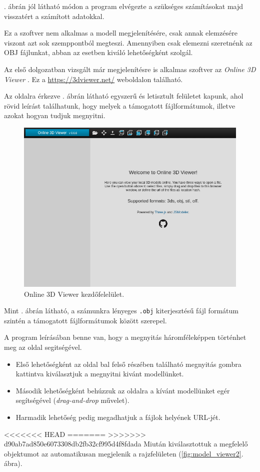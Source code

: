 . ábrán jól látható módon a program elvégezte a szükséges számításokat majd visszatért a számított adatokkal.

Ez a szoftver nem alkalmas a modell megjelenítésére, csak annak elemzésére viszont azt sok szemppontból megteszi. Amennyiben csak elemezni szeretnénk az OBJ fájlunkat, abban az esetben kiváló lehetőségként szolgál.


Az első dolgozatban vizsgált már megjelenítésre is alkalmas szoftver az \textit{Online 3D Viewer} \cite{online2014viktor}.
Ez a \url{https://3dviewer.net/} weboldalon található.

Az oldalra érkezve . ábrán látható egyszerű és letisztult felületet kapunk, ahol rövid leírást találhatunk, hogy melyek a támogatott fájlformátumok, illetve azokat hogyan tudjuk megnyitni.

\begin{figure}[h]
\centering
\includegraphics[width=\textwidth]{images/Model_Viewer.png}
\caption{Online 3D Viewer kezdőfelelület.}
\label{fig:model_viewer1}
\end{figure}

Mint . ábrán látható, a számunkra lényeges \texttt{.obj} kiterjesztésű fájl formátum szintén a támogatott fájlformátumok között szerepel.

A program leírásában benne van, hogy a megnyitás háromféleképpen történhet meg az oldal segitségével.
\begin{itemize}
\item Első lehetőségként az oldal bal felső részében található megnyitás gombra kattintva kiválasztjuk a megnyitni kivánt modellünket.
\item Második lehetőségként behúzzuk az oldalra a kívánt modellünket egér segítségével (\textit{drag-and-drop} művelet).
\item Harmadik lehetőség pedig megadhatjuk a fájlok helyének URL-jét.
\end{itemize}
<<<<<<< HEAD
\newpage
=======
>>>>>>> d90ab7ad850e6073308db2fb32cf995d4f8fdada
Miután kiválasztottuk a megfelelő objektumot az automatikusan megjelenik a rajzfelületen  (\ref{fig:model_viewer2}. ábra).

